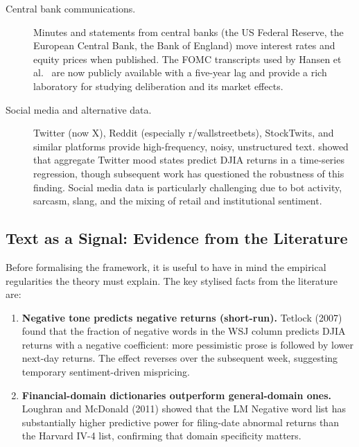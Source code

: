 \begin{context}
\begin{description}
  \item[Central bank communications.] Minutes and statements from central banks (the US
    Federal Reserve, the European Central Bank, the Bank of England) move interest rates
    and equity prices when published.  The FOMC transcripts used by Hansen et al.\
    \cite{hansen2018transparency} are now publicly available with a five-year lag and
    provide a rich laboratory for studying deliberation and its market effects.

  \item[Social media and alternative data.] Twitter (now X), Reddit (especially
    r/wallstreetbets), StockTwits, and similar platforms provide high-frequency, noisy,
    unstructured text.  \citet{bollen2011twitter} %
    showed that aggregate Twitter mood states predict DJIA returns in a time-series
    regression, though subsequent work has questioned the robustness of this finding.
    Social media data is particularly challenging due to bot activity, sarcasm, slang,
    and the mixing of retail and institutional sentiment.
\end{description}

\subsection{Text as a Signal: Evidence from the Literature}
\label{sec:motivation-evidence}

Before formalising the framework, it is useful to have in mind the empirical regularities
the theory must explain.  The key stylised facts from the literature are:

\begin{enumerate}
  \item \textbf{Negative tone predicts negative returns (short-run).}  Tetlock (2007)
    found that the fraction of negative words in the WSJ column predicts DJIA returns
    with a negative coefficient: more pessimistic prose is followed by lower next-day
    returns.  The effect reverses over the subsequent week, suggesting temporary
    sentiment-driven mispricing.

  \item \textbf{Financial-domain dictionaries outperform general-domain ones.}
    Loughran and McDonald (2011) showed that the LM Negative word list has substantially
    higher predictive power for filing-date abnormal returns than the Harvard IV-4 list,
    confirming that domain specificity matters.


\end{enumerate}
\end{context}
